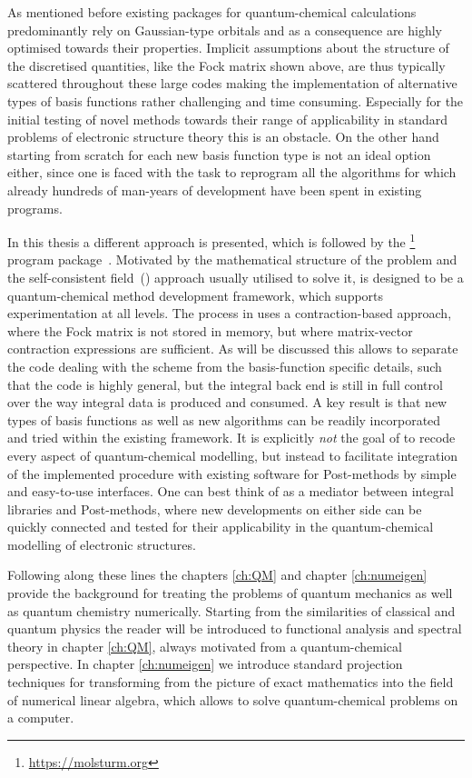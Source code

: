 As mentioned before existing packages for quantum-chemical calculations
predominantly rely on Gaussian-type orbitals
and as a consequence are highly optimised towards their properties.
Implicit assumptions
about the structure of the discretised quantities,
like the Fock matrix shown above,
are thus typically scattered throughout these large codes
making the implementation of alternative types of basis functions
rather challenging and time consuming.
Especially for the initial testing of novel methods
towards their range of applicability
in standard problems of electronic structure theory
this is an obstacle.
On the other hand starting from scratch for each new basis function type
is not an ideal option either,
since one is faced with the task to reprogram all the algorithms for which
already hundreds of man-years of development have been spent in existing programs.

In this thesis a different approach is presented,
which is followed by the \molsturm%
\footnote{\url{https://molsturm.org}}
program package~\cite{molsturmWeb}.
Motivated by the mathematical structure of the \HF problem
and the self-consistent field~(\SCF) approach usually utilised
to solve it, \molsturm is designed
to be a quantum-chemical method development framework,
which supports experimentation at all levels.
The \SCF process in \molsturm uses a contraction-based approach,
where the Fock matrix is not stored in memory,
but where matrix-vector contraction expressions are sufficient.
As will be discussed this allows to separate the code dealing with the \SCF scheme
from the basis-function specific details,
such that the \SCF code is highly general,
but the integral back end is still in full control
over the way integral data is produced and consumed.
A key result is that new types of basis functions
as well as new \SCF algorithms can be readily incorporated
and tried within the existing framework.
It is explicitly \emph{not} the goal of \molsturm to recode
every aspect of quantum-chemical modelling,
but instead to facilitate integration
of the implemented \SCF procedure
with existing software for Post-\HF methods
by simple and easy-to-use interfaces.
One can best think of \molsturm as a mediator
between integral libraries and Post-\HF methods,
where new developments on either side
can be quickly connected and tested for their applicability
in the quantum-chemical modelling of electronic structures.

Following along these lines the chapters
\ref{ch:QM} and chapter \ref{ch:numeigen}
provide the background for treating the problems of quantum mechanics
as well as quantum chemistry numerically.
Starting from the similarities of classical and quantum physics
the reader will be introduced to functional analysis
and spectral theory in chapter \ref{ch:QM},
always motivated from a quantum-chemical perspective.
In chapter \ref{ch:numeigen} we introduce standard projection techniques
for transforming from the picture of exact mathematics
into the field of numerical linear algebra,
which allows to solve quantum-chemical problems on a computer.

